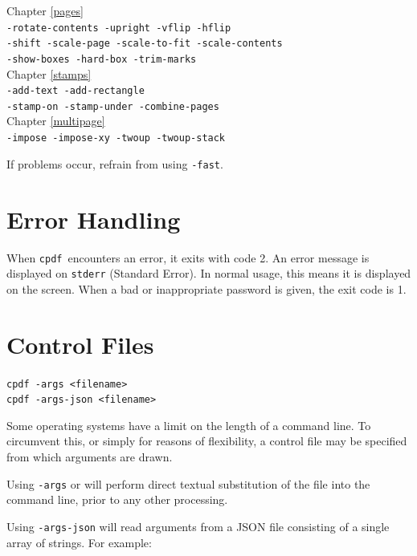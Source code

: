 \documentclass{book}
\newcommand{\cpdf}{\texttt{cpdf}}
\begin{document}
\begin{framed}
\small\noindent Chapter \ref{pages}\\
\noindent\small\verb!-rotate-contents -upright -vflip -hflip!\\
\small\verb!-shift -scale-page -scale-to-fit -scale-contents!\\
\small\verb!-show-boxes -hard-box -trim-marks!\\

\noindent Chapter \ref{stamps}\\
\noindent\small\verb!-add-text -add-rectangle!\\
\small\verb!-stamp-on -stamp-under -combine-pages!\\

\noindent Chapter \ref{multipage}\\
\noindent\verb!-impose -impose-xy -twoup -twoup-stack!
\end{framed}

\noindent If problems occur, refrain from using \verb!-fast!.

\section{Error Handling}
When \cpdf\ encounters an error, it exits with code 2. An error message is
displayed on \texttt{stderr} (Standard Error). In normal usage, this means it is
displayed on the screen. When a bad or inappropriate password is given, the exit code is 1.

\section{Control Files}
\begin{framed}
  \noindent\small\verb!cpdf -args <filename>!\\
  \noindent\small\verb!cpdf -args-json <filename>!
\end{framed}

Some operating systems have a limit on the length of a command line. To
circumvent this, or simply for reasons of flexibility, a control file may be
specified from which arguments are drawn.

Using \texttt{-args} or will perform direct textual substitution of the file into the command line, prior to any other processing.

Using \texttt{-args-json} will read arguments from a JSON file consisting of a single array of strings. For example:
\end{document}
